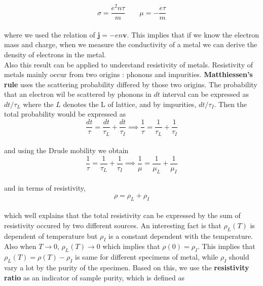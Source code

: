 \documentclass[paper=a4, fontsize=11pt]{scrartcl}
\begin{document}
\begin{equation}\nonumber
\sigma = \frac{e^2 n \tau }{m}\qquad \mu = -\frac{e\tau}{m}
\end{equation}\\

where we used the relation of $\mathbf{j} = -en \mathbf{v}$. This implies that if we know the electron mass and charge, when we measure the conductivity of a metal we can derive the density of electrons in the metal. \\

Also this result can be applied to understand resistivity of metals. Resistivity of metals mainly occur from two origins : phonons and impurities. \textbf{Matthiessen's rule} uses the scattering probability differed by those two origins. The probability that an electron wil be scattered by phonons in $dt$ interval can be expressed as $dt/\tau_{L}$ where the $L$ denotes the L of lattice, and by impurities, $dt/\tau_{I}$. Then the total probability would be expressed as \\

\begin{equation}\nonumber
	\frac{dt}{\tau} = \frac{dt}{\tau_L} +  \frac{dt}{\tau_I} \implies 	\frac{1}{\tau} = \frac{1}{\tau_L} +  \frac{1}{\tau_I}
\end{equation}\\

and using the Drude mobility we obtain \\

\begin{equation}\nonumber
	\frac{1}{\tau} = \frac{1}{\tau_L} +  \frac{1}{\tau_I} \implies  \frac{1}{\mu} = \frac{1}{\mu_L} +  \frac{1}{\mu_I} 
\end{equation}\\

and in terms of resistivity, \\

\begin{equation}\nonumber
	\rho = \rho_L + \rho_I
\end{equation}\\

which well explains that the total resistivity can be expressed by the sum of resistivity occured by two different sources. An interesting fact is that $\rho_L(T)$ is dependent of temperature but $\rho_I$ is a constant dependent with the temperature. Also when $T\to 0$, $\rho_L(T) \to 0$ which implies that $\rho(0)= \rho_I$. This implies that $\rho_L(T) = \rho(T) - \rho_I $ is same for different specimens of metal, while $\rho_I$ should vary a lot by the purity of the specimen. Based on this, we use the \textbf{resistivity ratio} as an indicator of sample purity, which is defined as 
 
\end{document}
